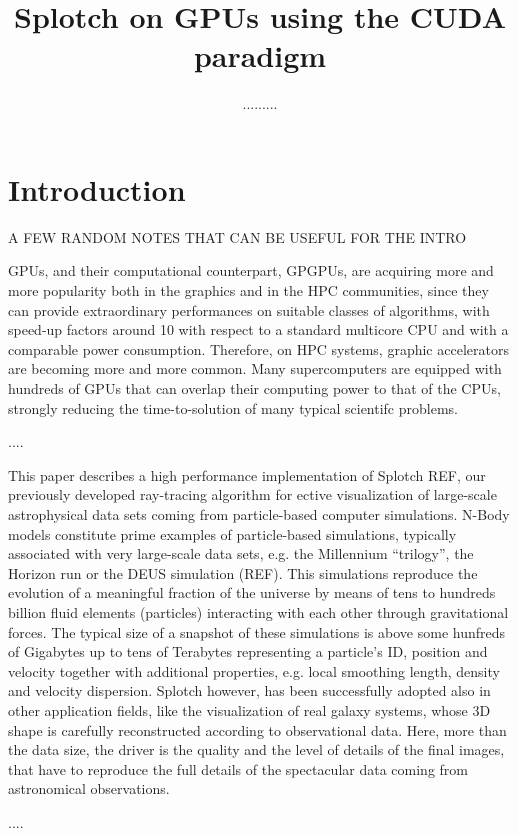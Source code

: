 \documentclass[11pt]{article}
\title{Splotch on GPUs using the CUDA paradigm}
\author{.........}
\begin{document}
\maketitle

\section{Introduction}

A FEW RANDOM NOTES THAT CAN BE USEFUL FOR THE INTRO

GPUs, and their computational counterpart, GPGPUs, are 
acquiring more and more popularity both in the graphics and in the HPC 
communities, since they can provide extraordinary performances on suitable
classes of algorithms, with speed-up factors around 10 with respect to 
a standard multicore CPU and with a comparable power consumption.
Therefore, on HPC systems, graphic accelerators are becoming more and more common. 
Many supercomputers are equipped with hundreds of GPUs that can overlap 
their computing power to that of the CPUs, strongly reducing the time-to-solution
of many typical scientifc problems.

....

This paper describes a high performance implementation of Splotch REF, 
our previously developed ray-tracing
algorithm for ective visualization of large-scale astrophysical 
data sets coming from particle-based computer simulations.
N-Body models constitute prime examples of particle-based simulations, typically associated with very
large-scale data sets, e.g. the Millennium ``trilogy'', the Horizon run or the DEUS simulation (REF).
This simulations reproduce the evolution of a meaningful fraction
of the universe by means of tens to hundreds billion fluid elements (particles) 
interacting with each other through gravitational
forces. The typical size of a snapshot of these simulations is above some hunfreds of Gigabytes up to tens
of Terabytes representing a particle’s
ID, position and velocity together with additional properties, e.g. 
local smoothing length, density and velocity dispersion.
Splotch however, has been successfully adopted also in other application fields,
like the visualization of real galaxy systems, whose 3D shape is carefully reconstructed
according to observational data. Here, more than the data size, the driver is
the quality and the level of details of the final images, 
that have to reproduce the full details of the
spectacular data coming from astronomical observations.

....
\end{document}
